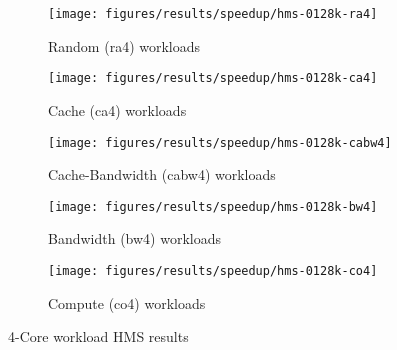 \begin{figure}
    \centering
    \begin{subfigure}[b]{\textwidth}
            \texttt{[image: figures/results/speedup/hms-0128k-ra4]}
            \caption{Random (ra4) workloads}
            \label{fig:results:4core:hms:random}
    \end{subfigure}

    \begin{subfigure}[b]{0.5\textwidth}
            \texttt{[image: figures/results/speedup/hms-0128k-ca4]}
            \caption{Cache (ca4) workloads}
            \label{fig:results:4core:hms:cache}
    \end{subfigure}%
    \begin{subfigure}[b]{0.5\textwidth}
            \texttt{[image: figures/results/speedup/hms-0128k-cabw4]}
            \caption{Cache-Bandwidth (cabw4) workloads}
            \label{fig:results:4core:hms:cache-bw}
    \end{subfigure}

    \begin{subfigure}[b]{0.5\textwidth}
            \texttt{[image: figures/results/speedup/hms-0128k-bw4]}
            \caption{Bandwidth (bw4) workloads}
            \label{fig:results:4core:hms:bw}
    \end{subfigure}%
    \begin{subfigure}[b]{0.5\textwidth}
            \texttt{[image: figures/results/speedup/hms-0128k-co4]}
            \caption{Compute (co4) workloads}
            \label{fig:results:4core:hms:co}
    \end{subfigure}%

    \caption{4-Core workload HMS results}\label{fig:results:4core:hms}
\end{figure}

